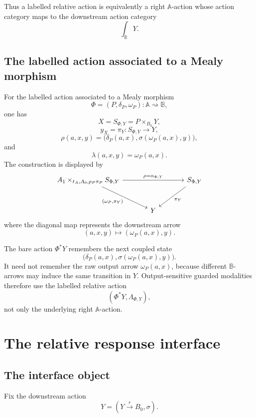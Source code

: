 Thus a labelled relative action is equivalently a right \(\mathbb A\)-action
whose action category maps to the downstream action category
\[
\int_{\mathbb B}Y.
\]

\subsection{The labelled action associated to a Mealy morphism}
\label{subsec:poly-relative-mealy-labelled-action}

For the labelled action associated to a Mealy morphism
\[
\Phi=(P,\delta_P,\omega_P):\mathbb A\rightsquigarrow\mathbb B,
\]
one has
\[
X=S_{\Phi,Y}=P\times_{B_0}Y,
\]
\[
y_X=\pi_Y:S_{\Phi,Y}\to Y,
\]
\[
\rho(a,x,y)
=
\bigl(
\delta_P(a,x),
\sigma(\omega_P(a,x),y)
\bigr),
\]
and
\[
\lambda(a,x,y)=\omega_P(a,x).
\]
The construction is displayed by
\[
\begin{tikzcd}[column sep=large,row sep=large]
A_1\times_{t_A,A_0,p_P\pi_P}S_{\Phi,Y}
  \arrow[rr,"{\rho=\alpha_{\Phi,Y}}"]
  \arrow[dr,"{(\omega_P,\pi_Y)}"']
&&
S_{\Phi,Y}
  \arrow[dl,"\pi_Y"]
\\
&
Y
&
\end{tikzcd}
\]
where the diagonal map represents the downstream arrow
\[
(a,x,y)\longmapsto(\omega_P(a,x),y).
\]

\begin{remark}
\label{rem:poly-relative-labelled-not-bare-action}
The bare action \(\Phi^\ast Y\) remembers the next coupled state
\[
\bigl(
\delta_P(a,x),
\sigma(\omega_P(a,x),y)
\bigr).
\]
It need not remember the raw output arrow \(\omega_P(a,x)\), because different
\(\mathbb B\)-arrows may induce the same transition in \(Y\).  Output-sensitive
guarded modalities therefore use the labelled relative action
\[
(\Phi^\ast Y,\Lambda_{\Phi,Y}),
\]
not only the underlying right \(\mathbb A\)-action.
\end{remark}

\section{The relative response interface}
\label{sec:poly-relative-interface}

\subsection{The interface object}
\label{subsec:poly-relative-interface-object}

Fix the downstream action
\[
Y=(Y\xrightarrow{r}B_0,\sigma).
\]

